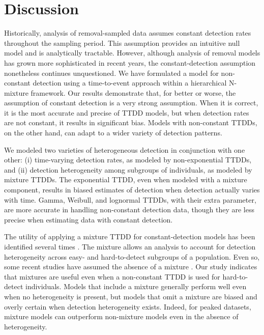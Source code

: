 \documentclass[useAMS,usenatbib,referee,12pt]{article}
\begin{document}
\section{Discussion}

Historically, analysis of removal-sampled data assumes constant detection rates throughout the sampling period.  
This assumption provides an intuitive null model and is analytically tractable.  
However, although analysis of removal models has grown more sophisticated in recent years, the constant-detection assumption nonetheless continues unquestioned.  
We have formulated a model for non-constant detection using a time-to-event approach within a hierarchical N-mixture framework.  
Our results demonstrate that, for better or worse, the assumption of constant detection is a very strong assumption.  
When it is correct, it is the most accurate and precise of TTDD models, but when detection rates are not constant, it results in significant bias.  
Models with non-constant TTDDs, on the other hand, can adapt to a wider variety of detection patterns.

We modeled two varieties of heterogeneous detection in conjunction with one other: (i) time-varying detection rates, as modeled by non-exponential TTDDs, and (ii) detection heterogeneity among subgroups of individuals, as modeled by mixture TTDDs.  
The exponential TTDD, even when modeled with a mixture component, results in biased estimates of detection when detection actually varies with time.  
Gamma, Weibull, and lognormal TTDDs, with their extra parameter, are more accurate in handling non-constant detection data, though they are less precise when estimating data with constant detection.

The utility of applying a mixture TTDD for constant-detection models has been identified several times \citep{Pledger2000, Farnsworth2002, Alldredge2007, Reidy2011}.  
The mixture allows an analysis to account for detection heterogeneity across easy- and hard-to-detect subgroups of a population.  
Even so, some recent studies have assumed the absence of a mixture \citep{Solymos2013, Amundson2014}.  
Our study indicates that mixtures are useful even when a non-constant TTDD is used for hard-to-detect individuals.  
Models that include a mixture generally perform well even when no heterogeneity is present, but models that omit a mixture are biased and overly certain when detection heterogeneity exists.  
Indeed, for peaked datasets, mixture models can outperform non-mixture models even in the absence of heterogeneity.
\end{document}
